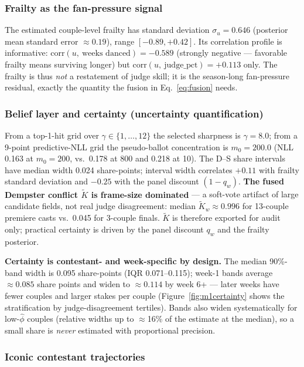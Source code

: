 \documentclass[10pt]{article}
\begin{document}
\subsubsection{Frailty as the fan-pressure signal}

The estimated couple-level frailty has standard deviation $\sigma_u = 0.646$ (posterior
mean standard error $\approx 0.19$), range $[-0.89, +0.42]$. Its correlation profile is
informative: $\mathrm{corr}(u,\ \text{weeks danced}) = -0.589$ (strongly negative ---
favorable frailty means surviving longer) but $\mathrm{corr}(u,\ \text{judge\_pct}) =
+0.113$ only. The frailty is thus \emph{not} a restatement of judge skill; it is the
season-long fan-pressure residual, exactly the quantity the fusion in
Eq.~\eqref{eq:fusion} needs.

\subsubsection{Belief layer and certainty (uncertainty quantification)}

From a top-1-hit grid over $\gamma \in \{1,\dots,12\}$ the selected sharpness is
$\gamma = 8.0$; from a 9-point predictive-NLL grid the pseudo-ballot concentration is
$m_0 = 200.0$ (NLL 0.163 at $m_0=200$, vs.\ 0.178 at 800 and 0.218 at 10). The D--S share
intervals have median width 0.024 share-points; interval width correlates $+0.11$ with
frailty standard deviation and $-0.25$ with the panel discount $(1 - q_w)$. \textbf{The
fused Dempster conflict $\widetilde K$ is frame-size dominated} --- a soft-vote artifact of
large candidate fields, not real judge disagreement: median $\widetilde K_w \approx 0.996$
for 13-couple premiere casts vs.\ 0.045 for 3-couple finals. $\widetilde K$ is therefore
exported for audit only; practical certainty is driven by the panel discount $q_w$ and the
frailty posterior.

\textbf{Certainty is contestant- and week-specific by design.} The median 90\%-band width
is 0.095 share-points (IQR 0.071--0.115); week-1 bands average $\approx 0.085$ share
points and widen to $\approx 0.114$ by week 6+ --- later weeks have fewer couples and
larger stakes per couple (Figure~\ref{fig:m1certainty} shows the stratification by
judge-disagreement tertiles). Bands also widen systematically for low-$\hat\phi$ couples
(relative widths up to $\approx$16\% of the estimate at the median), so a small share is
\emph{never} estimated with proportional precision.

\subsubsection{Iconic contestant trajectories}
\end{document}
